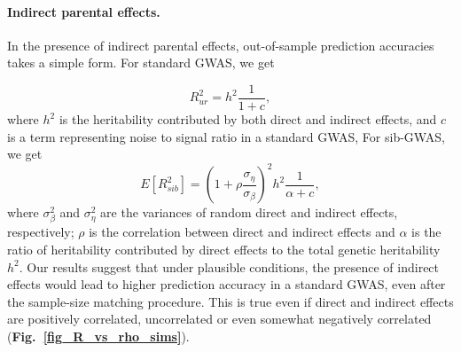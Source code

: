 \documentclass[hidelinks, 12pt]{article}
\begin{document}
\paragraph{Indirect parental effects.}  In the presence of indirect parental effects, out-of-sample prediction accuracies takes a simple form. For standard GWAS, we get

$$R_{ur}^2 = h^2\frac{1}{1+c},$$ where $h^2$ is the heritability contributed by both direct and indirect effects, and $c$ is a term representing noise to signal ratio in a standard GWAS,  For sib-GWAS, we get
$$E[R_{sib}^2] = (1+\rho \frac{\sigma_\eta}{\sigma_\beta})^2 h^2 \frac{1}{\alpha + c},$$ where $\sigma_\beta^2$ and $\sigma_\eta^2$ are the variances of random direct and indirect effects, respectively; $\rho$ is the correlation between direct and indirect effects and $\alpha$ is the ratio of heritability contributed by direct effects to the total genetic heritability $h^2$.  Our results suggest that under plausible conditions, the presence of indirect effects would lead to higher prediction accuracy in a standard GWAS,  even after the sample-size matching procedure.  This is true even if direct and indirect effects are positively correlated, uncorrelated or even somewhat negatively correlated ({\bf Fig.~\ref{fig_R_vs_rho_sims}}).
\end{document}
